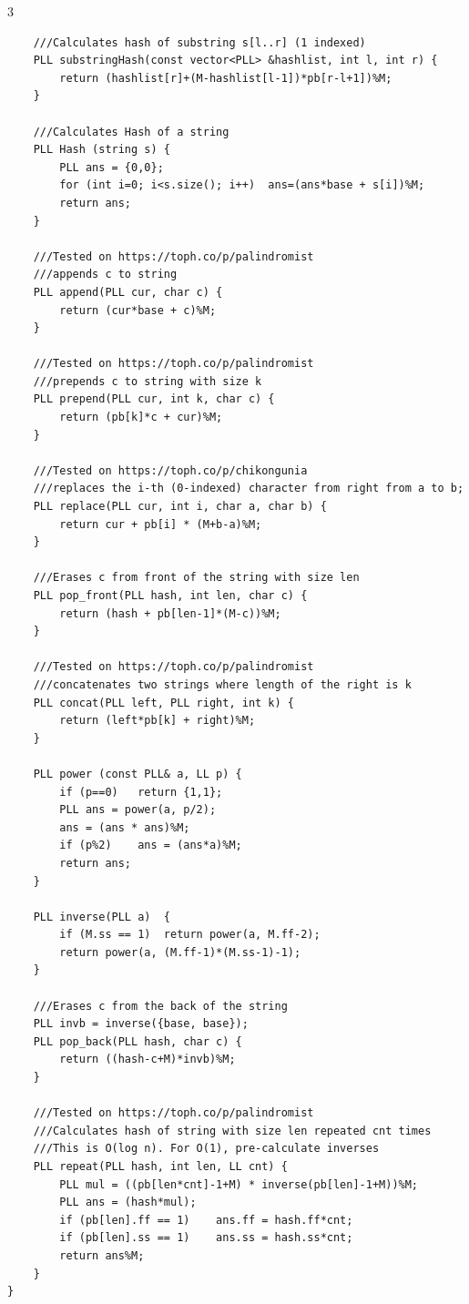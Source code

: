 \documentclass[twoside]{article}
\begin{document}
\begin{multicols*}{3}
\begin{verbatim}
    ///Calculates hash of substring s[l..r] (1 indexed)
    PLL substringHash(const vector<PLL> &hashlist, int l, int r) {
        return (hashlist[r]+(M-hashlist[l-1])*pb[r-l+1])%M;
    }

    ///Calculates Hash of a string
    PLL Hash (string s) {
        PLL ans = {0,0};
        for (int i=0; i<s.size(); i++)  ans=(ans*base + s[i])%M;
        return ans;
    }

    ///Tested on https://toph.co/p/palindromist
    ///appends c to string
    PLL append(PLL cur, char c) {
        return (cur*base + c)%M;
    }

    ///Tested on https://toph.co/p/palindromist
    ///prepends c to string with size k
    PLL prepend(PLL cur, int k, char c) {
        return (pb[k]*c + cur)%M;
    }

    ///Tested on https://toph.co/p/chikongunia
    ///replaces the i-th (0-indexed) character from right from a to b;
    PLL replace(PLL cur, int i, char a, char b) {
        return cur + pb[i] * (M+b-a)%M;
    }

    ///Erases c from front of the string with size len
    PLL pop_front(PLL hash, int len, char c) {
        return (hash + pb[len-1]*(M-c))%M;
    }

    ///Tested on https://toph.co/p/palindromist
    ///concatenates two strings where length of the right is k
    PLL concat(PLL left, PLL right, int k) {
        return (left*pb[k] + right)%M;
    }

    PLL power (const PLL& a, LL p) {
        if (p==0)   return {1,1};
        PLL ans = power(a, p/2);
        ans = (ans * ans)%M;
        if (p%2)    ans = (ans*a)%M;
        return ans;
    }

    PLL inverse(PLL a)  {
        if (M.ss == 1)  return power(a, M.ff-2);
        return power(a, (M.ff-1)*(M.ss-1)-1);
    }

    ///Erases c from the back of the string
    PLL invb = inverse({base, base});
    PLL pop_back(PLL hash, char c) {
        return ((hash-c+M)*invb)%M;
    }

    ///Tested on https://toph.co/p/palindromist
    ///Calculates hash of string with size len repeated cnt times
    ///This is O(log n). For O(1), pre-calculate inverses
    PLL repeat(PLL hash, int len, LL cnt) {
        PLL mul = ((pb[len*cnt]-1+M) * inverse(pb[len]-1+M))%M;
        PLL ans = (hash*mul);
        if (pb[len].ff == 1)    ans.ff = hash.ff*cnt;
        if (pb[len].ss == 1)    ans.ss = hash.ss*cnt;
        return ans%M;
    }
}


\end{verbatim}
\end{multicols*}
\end{document}
